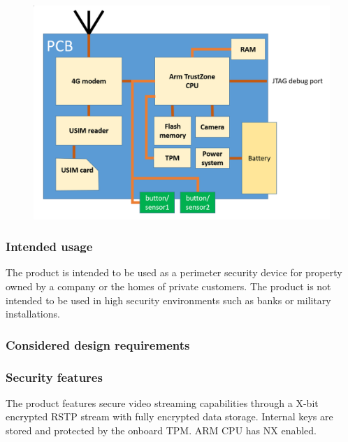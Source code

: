 \documentclass[10pt]{article}
\begin{document}
      \begin{figure}[!h]
        \center
        \includegraphics[width=\textwidth]{input/pcb_camera.png}
      \end{figure}

      \subsubsection{Intended usage}

        The product is intended to be used as a perimeter security device for
        property owned by a company or the homes of private customers. The
        product is not intended to be used in high security environments such
        as banks or military installations.

      \subsubsection{Considered design requirements}


      \subsubsection{Security features}

        The product features secure video streaming capabilities through a
        X-bit encrypted RSTP stream with fully encrypted data storage. Internal
        keys are stored and protected by the onboard TPM. 
	ARM CPU has NX enabled. %
\end{document}

